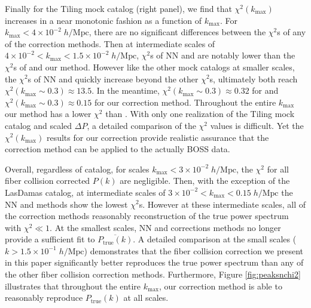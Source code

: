 \documentclass{emulateapj}
\begin{document}
Finally for the Tiling mock catalog (right panel), we find that $\chi^2(k_\mathrm{max})$ increases in a near monotonic fashion as a function of $k_\mathrm{max}$. For $k_\mathrm{max} < 4\times10^{-2} \; h/\mathrm{Mpc}$, there are no significant differences between the $\chi^2$s of any of the correction methods. Then at intermediate scales of $4\times10^{-2} < k_\mathrm{max} < 1.5\times 10^{-2} \; h/\mathrm{Mpc}$, $\chi^2$s of NN and \cite{Beutler:2014aa} are notably lower than the $\chi^2$s of \cite{Gil-Marin:2014aa} and our method. However like the other mock catalogs at smaller scales, the $\chi^2$s of NN and \cite{Beutler:2014aa} quickly increase beyond the other $\chi^2$s, ultimately both reach $\chi^2(k_\mathrm{max} \sim 0.3) \approx 13.5$. In the meantime, $\chi^2(k_\mathrm{max} \sim 0.3) \approx 0.32$ for \cite{Gil-Marin:2014aa} and $\chi^2(k_\mathrm{max} \sim 0.3) \approx 0.15$ for our correction method. Throughout the entire $k_\mathrm{max}$ our method has a lower $\chi^2$ than \cite{Gil-Marin:2014aa}. With only one realization of the Tiling mock catalog and scaled $\Delta P$, a detailed comparison of the $\chi^2$ values is difficult. Yet the $\chi^2(k_\mathrm{max})$ results for our correction provide realistic assurance that the correction method can be applied to the actually BOSS data.

Overall, regardless of catalog, for scales $k_\mathrm{max} < 3 \times 10^{-2} \;h/\mathrm{Mpc}$, the $\chi^2$ for all fiber collision corrected $P(k)$ are negligible. Then, with the exception of the LasDamas catalog, at intermediate scales of $3 \times 10^{-2} < k_\mathrm{max} < 0.15 \; h/\mathrm{Mpc}$ the NN and \cite{Beutler:2014aa} methods show the lowest $\chi^2$s. However at these intermediate scales, all of the correction methods reasonably reconstruction of the true power spectrum with $\chi^2 \ll 1$. At the smallest scales, NN and \cite{Beutler:2014aa} corrections methods no longer provide a sufficient fit to $\overline{P_\mathrm{true}(k)}$. A detailed comparison at the small scales ($k > 1.5 \times 10^{-1} \;h/\mathrm{Mpc}$) demonstrates that the fiber collision correction we present in this paper significantly better reproduces the true power spectrum than any of the other fiber collision correction methods. Furthermore, Figure \ref{fig:peaksnchi2} illustrates that throughout the entire $k_\mathrm{max}$, our correction method is able to reasonably reproduce $P_\mathrm{true}(k)$ at all scales. 
\end{document}
